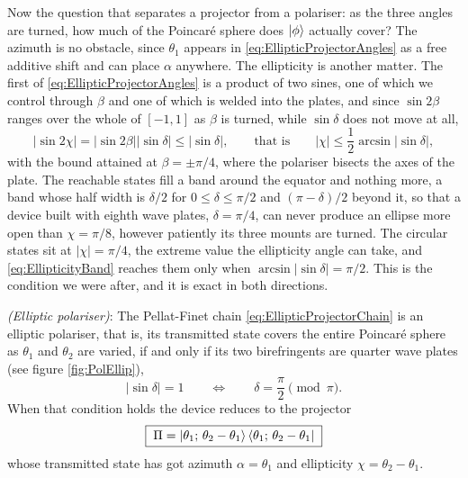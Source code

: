             Now the question that separates a projector from a polariser: as the three angles are turned, how much of the Poincaré sphere does $\ket{\phi}$ actually cover? The azimuth is no obstacle, since $\theta_1$ appears in \ref{eq:EllipticProjectorAngles} as a free additive shift and can place $\alpha$ anywhere. The ellipticity is another matter. The first of \ref{eq:EllipticProjectorAngles} is a product of two sines, one of which we control through $\beta$ and one of which is welded into the plates, and since $\sin2\beta$ ranges over the whole of $\left[-1,1\right]$ as $\beta$ is turned, while $\sin\delta$ does not move at all,
            \begin{equation}\label{eq:EllipticityBand}
                \left|\sin2\chi\right| = \left|\sin2\beta\right|\left|\sin\delta\right| \leq \left|\sin\delta\right| , \qquad\text{that is}\qquad \left|\chi\right| \leq \frac{1}{2}\arcsin\left|\sin\delta\right| ,
            \end{equation}
            with the bound attained at $\beta=\pm\pi/4$, where the polariser bisects the axes of the plate. The reachable states fill a band around the equator and nothing more, a band whose half width is $\delta/2$ for $0\leq\delta\leq\pi/2$ and $\left(\pi-\delta\right)/2$ beyond it, so that a device built with eighth wave plates, $\delta=\pi/4$, can never produce an ellipse more open than $\chi=\pi/8$, however patiently its three mounts are turned. The circular states sit at $\left|\chi\right|=\pi/4$, the extreme value the ellipticity angle can take, and \ref{eq:EllipticityBand} reaches them only when $\arcsin\left|\sin\delta\right|=\pi/2$. This is the condition we were after, and it is exact in both directions.

            \begin{myteo}
                \textit{(Elliptic polariser)}: The Pellat-Finet chain \ref{eq:EllipticProjectorChain} is an elliptic polariser, that is, its transmitted state covers the entire Poincaré sphere as $\theta_1$ and $\theta_2$ are varied, if and only if its two birefringents are quarter wave plates (see figure \ref{fig:PolEllip}),
                \begin{equation}\label{eq:QuarterWaveCondition}
                    \left|\sin\delta\right| = 1 \qquad\Longleftrightarrow\qquad \delta = \frac{\pi}{2} \pmod{\pi} .
                \end{equation}
                When that condition holds the device reduces to the projector
                \begin{equation}\label{eq:EllipticPolariser}
                    \boxed{\;\Pi = \ket{\theta_1;\,\theta_2-\theta_1}\bra{\theta_1;\,\theta_2-\theta_1}\;}
                \end{equation}
                whose transmitted state has got azimuth $\alpha=\theta_1$ and ellipticity $\chi=\theta_2-\theta_1$.
            \end{myteo}

